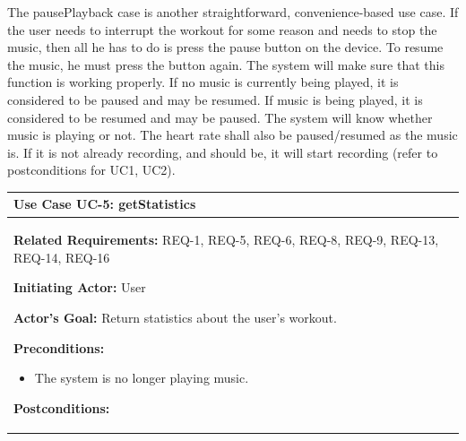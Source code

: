 \documentclass[letterpaper,english, 12pt]{scrreprt}
\begin{document}
The pausePlayback case is another straightforward, convenience-based use case. If the user needs to interrupt the workout for some reason and needs to stop the music, then all he has to do is press the pause button on the device. To resume the music, he must press the button again. The system will make sure that this function is working properly. If no music is currently being played, it is considered to be paused and may be resumed. If music is being played, it is considered to be resumed and may be paused. The system will know whether music is playing or not. The heart rate shall also be paused/resumed as the music is. If it is not already recording, and should be, it will start recording (refer to postconditions for UC1, UC2).

\begin{center}
        \begin{tabular}{|C{15cm}|}
                \hline
                        \textbf{Use Case UC-5: getStatistics}\\
                \hline
                        \begin{flushleft}
                                \textbf{Related Requirements: } REQ-1, REQ-5, REQ-6, REQ-8, REQ-9, REQ-13, REQ-14, REQ-16
                        \end{flushleft}
                        \begin{flushleft}
                                \textbf{Initiating Actor: } User
                        \end{flushleft}
                        \begin{flushleft}
                                \textbf{Actor's Goal: } Return statistics about the user's workout.
                        \end{flushleft}
                        \begin{flushleft}
                                \textbf{Preconditions: }
                        \end{flushleft}
                                \begin{itemize}
                                        \item The system is no longer playing music.
                                \end{itemize}
                        \begin{flushleft}
                                \textbf{Postconditions: }
                        \end{flushleft}
                                \begin{itemize}

\end{itemize}
\end{tabular}
\end{center}
\end{document}
